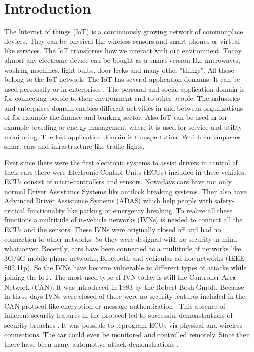 
\section{Introduction}

The Internet of things (IoT) is a continuously growing network of commonplace
devices. They can be physical like wireless sensors and smart phones or virtual
like services. The IoT transforms how we interact with our environment. Today
almost any electronic device can be bought as a smart version like microwaves,
washing machines, light bulbs, door locks and many other "things". All these
belong to the IoT network. The IoT has several application domains. It can be
used personally or in enterprises \cite{Mahmoud2015}. The personal and social
application domain is for connecting people to their environment and to other
people. The industries and enterprises domain enables different activities in
and between organizations of for example the finance and banking sector. Also
IoT can be used in for example breeding or energy management where it is used
for service and utility monitoring. The last application domain is
transportation. Which encompasses smart cars and infrastructure like traffic
lights.

Ever since there were the first electronic systems to assist drivers in control
of their cars there were Electronic Control Units (ECUs) included in these
vehicles. ECUs consist of micro-controllers and sensors. Nowadays cars have not
only normal Driver Assistance Systems like antilock breaking systems. They also
have Advanced Driver Assistance Systems (ADAS) which help people with
safety-critical functionality like parking or emergency breaking. To realize all
these functions a multitude of in-vehicle networks (IVNs) is needed to connect
all the ECUs and the sensors. These IVNs were originally closed off and had no
connection to other networks. So they were designed with no security in mind
whatsoever. Recently, cars have been connected to a multitude of networks like
3G/4G mobile phone networks, Bluetooth and vehicular ad hoc networks (IEEE
802.11p). So the IVNs have become vulnerable to different types of attacks while
joining the IoT. The most used type of IVN today is still the Controller Area
Network (CAN). It was introduced in 1983 by the Robert Bosh GmbH. Because in
these days IVNs were closed of there were no security features included in the
CAN protocol like encryption or message authentication \cite{Avatefipour2017}.
This absence of inherent security features in the protocol led to successful
demonstrations of security breaches \cite{Koscher2010}. It was possible to
reprogram ECUs via physical and wireless connections. The car could even be
monitored and controlled remotely. Since then there have been many automotive
attack demonstrations \cite{Hoppe2011,Checkoway2011,Cheah2017}.

